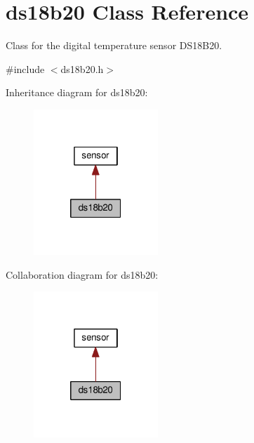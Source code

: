 \hypertarget{classds18b20}{}\section{ds18b20 Class Reference}
\label{classds18b20}


Class for the digital temperature sensor D\+S18\+B20.  




{\ttfamily \#include $<$ds18b20.\+h$>$}



Inheritance diagram for ds18b20\+:
\nopagebreak
\begin{figure}[H]
\begin{center}
\leavevmode
\includegraphics[width=133pt]{classds18b20__inherit__graph}
\end{center}
\end{figure}


Collaboration diagram for ds18b20\+:
\nopagebreak
\begin{figure}[H]
\begin{center}
\leavevmode
\includegraphics[width=133pt]{classds18b20__coll__graph}
\end{center}
\end{figure}
